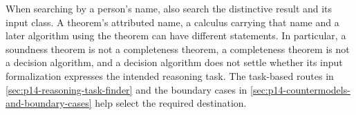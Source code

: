 When searching by a person's name, also search the distinctive result and its
input class. A theorem's attributed name, a calculus carrying that name and
a later algorithm using the theorem can have different statements. In
particular, a soundness theorem is not a completeness theorem, a completeness
theorem is not a decision algorithm, and a decision algorithm does not settle
whether its input formalization expresses the intended reasoning task.
The task-based routes in \cref{sec:p14-reasoning-task-finder} and the
boundary cases in \cref{sec:p14-countermodels-and-boundary-cases} help select
the required destination.
